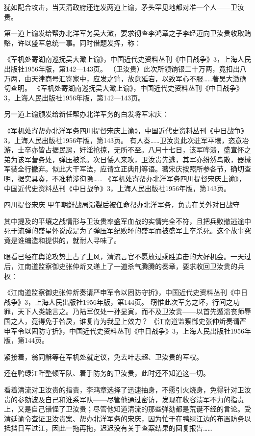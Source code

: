 \documentclass[12pt,UTF8]{ctexbook}
\begin{document}
犹如配合攻击，当天清政府还连发两道上谕，矛头罕见地都对准一个人——卫汝贵。

第一道上谕发给帮办北洋军务吴大澂，要求彻查李鸿章之子李经迈向卫汝贵收取贿赂，许以盛军总统一事。同时借题发挥，称：

《军机处寄湖南巡抚吴大澂上谕》，中国近代史资料丛刊《中日战争》3，上海人民出版社1956年版，第142—143页。
（卫汝贵）此次所领饷银二十万两，竟扣出八万两，由天津商号汇寄家中，应发之饷，故意延宕，以致军心不服……著吴大澂确切查明。 《军机处寄湖南巡抚吴大澂上谕》，中国近代史资料丛刊《中日战争》3，上海人民出版社1956年版，第142—143页。

另一道上谕颁发给新任帮办北洋军务的白发将军宋庆：

《军机处寄帮办北洋军务四川提督宋庆上谕》，中国近代史资料丛刊《中日战争》3，上海人民出版社1956年版，第143页。
有人奏……卫汝贵此次驻军平壤，恣意冶游，士卒亦皆占据民房，奸淫抢掠，无所不至。八月十七日，该军哗溃，盛宣怀之弟为该军营务处，弹压被杀。次日倭人来攻，卫汝贵先逃，其军亦纷然鸟散，器械军装全行撇弃。似此大干军法，应请立正典刑等语。著宋庆按照所参各节，确切查明，据实具奏，不准稍涉徇隐…… 《军机处寄帮办北洋军务四川提督宋庆上谕》，中国近代史资料丛刊《中日战争》3，上海人民出版社1956年版，第143页。


四川提督宋庆 甲午朝鲜战局溃裂后被任命帮办北洋军务，负责在关外对日战守

其中提及的平壤之战情形与卫汝贵率盛军血战的实情完全不符，且把兵败撤逃途中死于流弹的盛星怀说成是为了弹压军纪败坏的盛军而被盛军士卒杀死。这个故事究竟是谁编造和提供的，就耐人寻味了。

眼看已经在舆论攻势上占了上风，清流言官不愿放过乘胜追击的大好机会。一天过后，江南道监察御史张仲炘又递上了一道杀气腾腾的奏章，要求收回卫汝贵的兵权：

《江南道监察御史张仲炘奏请严申军令以固防守折》，中国近代史资料丛刊《中日战争》3，上海人民出版社1956年版，第144页。
窃惟此次军务之坏，行间之功罪，天下人类能言之。乃陆军仅处一孙显寅，而不及卫汝贵——以首先遁溃丧师辱国之人，竟得免于咎戾，谁复肯为我皇上效力？ 《江南道监察御史张仲炘奏请严申军令以固防守折》，中国近代史资料丛刊《中日战争》3，上海人民出版社1956年版，第144页。

紧接着，翁同龢等在军机处就定议，免去叶志超、卫汝贵的军权。

还在鸭绿江畔整顿军队、着手防务的卫汝贵，此时还不知道这一切。

看着清流对卫汝贵的指责，李鸿章选择了迅速抽身，不愿引火烧身，免得针对卫汝贵的参劾波及自己和淮系军队——尽管他通过密访，发现在收容溃军不力的指责上，又是自己错怪了卫汝贵；尽管他知道清流的那些弹劾都是荒诞不经的言论。受清廷谕令查证卫汝贵案、帮办北洋军务的宋庆，因为忙于在鸭绿江边的布置防务以抵挡日军过江，因此一拖再拖，迟迟没有关于查案结果的回复报告……
\end{document}
